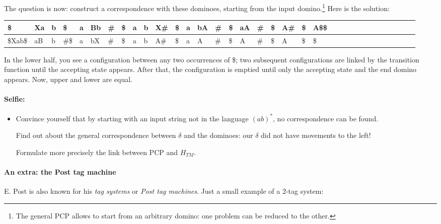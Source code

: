 The question is now: construct a correspondence with these dominoes,
starting from the input domino.\footnote{The general PCP allows to
  start from an arbitrary domino: one problem can be reduced to the
  other.} Here is the solution:


{\footnotesize
\begin{tabular}{|l|l|l|l|l|l|l|l|l|l|l|l|l|l|l|l|l|l|l|l|l|l|l|l|l|l|l|l|l|l|l|l|l|l|}
\hline
\$      & Xa & b & \$   & a & Bb & \# & \$ & a & b & X\# & \$ &  a & bA & \# & \$ & aA & \# & \$ & A\# & \$ & A\$\$\\ \hline
\$Xab\$ & aB & b & \#\$ & a & bX & \# & \$ & a & b & A\# & \$ &  a &  A & \# & \$ & A  & \# & \$ & A   & \$ & \$  \\
\hline
\end{tabular}
}


In the lower half, you see a configuration between any two occurrences of \$; 
two subsequent configurations are linked by the
transition function until the accepting state appears. After that,
the configuration is emptied until only the accepting state and the
end domino appears. Now, upper and lower are equal.


\paragraph{Selfie:}
\begin{itemize}
\item[]
Convince yourself that by starting with an input string not in the
language $(ab)^*$, no correspondence can be found.

Find out about the general correspondence between $\delta$ and the
dominoes: our $\delta$ did not have movements to the left!

Formulate more precisely the link between PCP and $H_{TM}$.
\end{itemize}



\paragraph{An extra: the Post tag machine}

E. Post is also known for his {\em tag systems} or {\em Post tag
  machines}. Just a small example of a 2-tag system:

